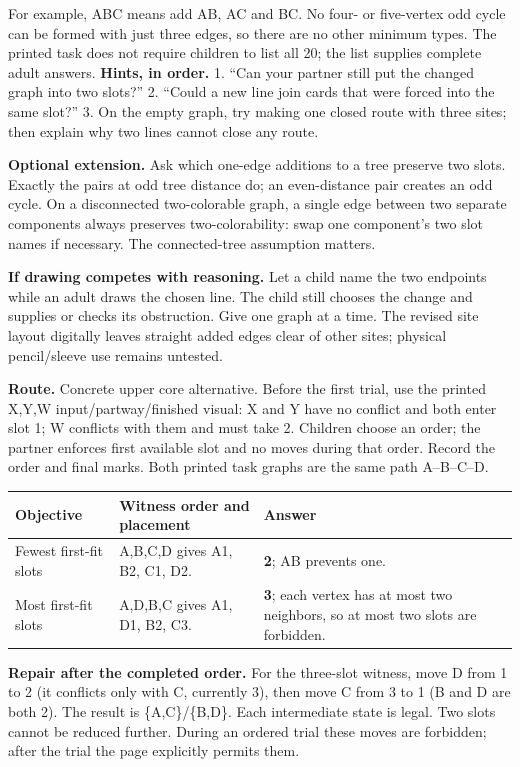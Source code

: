 \documentclass[10pt,letterpaper]{article}
\newcommand{\topic}[1]{\vspace{3pt}{\large\bfseries #1}\par}
\newcommand{\labelled}[2]{\textbf{#1} #2\par}
\newcommand{\hint}[1]{\textbf{Hints, in order.} #1\par}
\newcommand{\route}[1]{\textbf{Route.} #1\par}
\begin{document}
For example, ABC means add AB, AC and BC. No four- or five-vertex odd cycle can be formed with just three edges, so there are no other minimum types. The printed task does not require children to list all 20; the list supplies complete adult answers.
\hint{1. ``Can your partner still put the changed graph into two slots?'' 2. ``Could a new line join cards that were forced into the same slot?'' 3. On the empty graph, try making one closed route with three sites; then explain why two lines cannot close any route.}
\labelled{Optional extension.}{Ask which one-edge additions to a tree preserve two slots. Exactly the pairs at odd tree distance do; an even-distance pair creates an odd cycle. On a disconnected two-colorable graph, a single edge between two separate components always preserves two-colorability: swap one component's two slot names if necessary. The connected-tree assumption matters.}
\labelled{If drawing competes with reasoning.}{Let a child name the two endpoints while an adult draws the chosen line. The child still chooses the change and supplies or checks its obstruction. Give one graph at a time. The revised site layout digitally leaves straight added edges clear of other sites; physical pencil/sleeve use remains untested.}
\newpage
\topic{Student p. 7 / Problem 7: first-fit and repair}
\route{Concrete upper core alternative. Before the first trial, use the printed X,Y,W input/partway/finished visual: X and Y have no conflict and both enter slot 1; W conflicts with them and must take 2. Children choose an order; the partner enforces first available slot and no moves during that order. Record the order and final marks. Both printed task graphs are the same path A--B--C--D.}
\begin{tabularx}{\linewidth}{@{}p{1.1in}Xp{1.4in}@{}}
\toprule
Objective & Witness order and placement & Answer \\
\midrule
Fewest first-fit slots & A,B,C,D gives A1, B2, C1, D2. & \textbf{2}; AB prevents one. \\
Most first-fit slots & A,D,B,C gives A1, D1, B2, C3. & \textbf{3}; each vertex has at most two neighbors, so at most two slots are forbidden. \\
\bottomrule
\end{tabularx}\par\smallskip
\labelled{Repair after the completed order.}{For the three-slot witness, move D from 1 to 2 (it conflicts only with C, currently 3), then move C from 3 to 1 (B and D are both 2). The result is \{A,C\}/\{B,D\}. Each intermediate state is legal. Two slots cannot be reduced further. During an ordered trial these moves are forbidden; after the trial the page explicitly permits them.}
\end{document}
